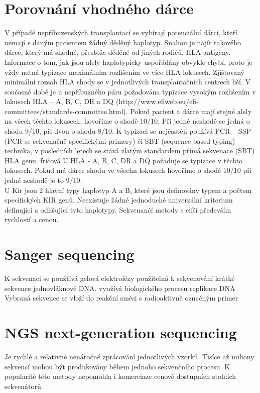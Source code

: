 \documentclass[czech,DP]{thesiskiv}
\begin{document}
\section{Porovnání vhodného dárce}
V případě nepříbuzenských transplantací se vybírají potenciální dárci, kteří nemají s daným
pacientem žádný děděný haplotyp. Snahou je najít takového dárce, který má shodné, přestože
děděné od jiných rodičů, HLA antigeny. Informace o tom, jak jsou alely haplotypicky
uspořádány obvykle chybí, proto je vždy nutná typizace maximálním rozlišením ve více
HLA lokusech. Zjišťovaný minimální rozsah HLA shody se v jednotlivých transplantačních
centrech liší. V současné době je u nepříbuzného páru požadována typizace vysokým
rozlišením v lokusech HLA – A, B, C, DR a DQ (http://www.efiweb.eu/efi-
committees/standards-committee.html). Pokud pacient a dárce mají stejné alely na všech
těchto lokusech, hovoříme o shodě 10/10. Při jedné neshodě se jedná o shodu 9/10, při dvou o
shodu 8/10.
K typizaci se nejčastěji používá PCR – SSP (PCR se sekvenačně specifickými primery) či
SBT (sequence based typing) technika, v posledních letech se stává zlatým standardem přímá
sekvenace (SBT) HLA genu.
fričová
U HLA - A, B, C, DR a DQ požaduje se typizace v těchto lokusech. Pokud má dárce shodu ve všechn lokusech hovoříme o shodě 10/10 při jedné neshodě je to 9/10.
\\
U Kir jsou 2 hlavní typy haplotyp A a B, které jsou definovány typem a počtem specifických KIR genů. Neexistuje žádné jednoduché univerzální kriterium definující a odlišující tyto haplotypy. 
Sekvenančí metody s elíší především rychlostí a cenou.
\section{Sanger sequencing}
 K sekvenaci se použtívá gelová elektrofézy
 použitelná k sekvenování krátké sekvence jednovláknové DNA. 
 využívá biologického procesu replikace DNA
 Vybraná sekvence se vloží do reakční směsi s radioaktivně označným primer
 
 
 
\section{NGS next-generation sequencing}
Je rychlé a relativné nenáročné zprácování jednotlivých vzorků. Tisíce až miliony sekvencí mohou být produkovány během jednoho sekvenčního procesu. K popularitě této metody nepomohla i komerciaze cenově dostupních stolních sekvenátorů.
\end{document}
